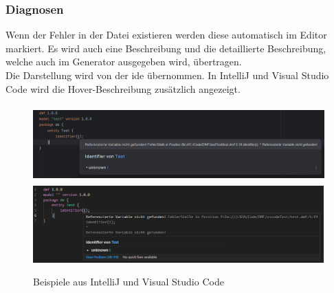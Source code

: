 \documentclass[./einleitung.tex]{subfiles}
\begin{document}
    \subsubsection{Diagnosen}\label{subsubsec:useDiagnosen}
    Wenn der Fehler in der Datei existieren werden diese automatisch im Editor markiert.
    Es wird auch eine Beschreibung und die detaillierte Beschreibung, welche auch im Generator ausgegeben wird, übertragen.\\
    Die Darstellung wird von der \acrshort{ide} übernommen.
    In IntelliJ und Visual Studio Code wird die Hover-Beschreibung zusätzlich angezeigt.\\
    \begin{figure}[H]
        \centering
        \includegraphics[keepaspectratio,height=8em]{bilder/markierung-fehler-intellij}
        \includegraphics[keepaspectratio,height=8em]{bilder/markierung-fehler-vscode}
        \caption{Beispiele aus IntelliJ und Visual Studio Code}
        \label{fig:markierung-fehler-intellij}
    \end{figure}
\end{document}
